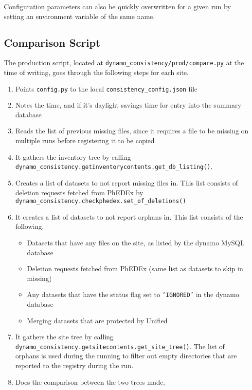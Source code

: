 Configuration parameters can also be quickly overwritten for a given run by
setting an environment variable of the same name.

\subsection{Comparison Script}

The production script,
located at \texttt{dynamo\_consistency/prod/compare.py} at the time of writing,
goes through the following steps for each site.
\begin{enumerate}
\item Points \texttt{config.py} to the local \texttt{consistency\_config.json} file
\item Notes the time, and if it’s daylight savings time for entry into the summary database
\item Reads the list of previous missing files,
  since it requires a file to be missing on multiple
  runs before registering it to be copied
\item It gathers the inventory tree by calling \\
  \texttt{dynamo\_consistency.getinventorycontents.get\_db\_listing()}.
\item Creates a list of datasets to not report missing files in.
  This list consists of deletion requests fetched from PhEDEx by \\
  \texttt{dynamo\_consistency.checkphedex.set\_of\_deletions()}
\item It creates a list of datasets to not report orphans in.
  This list consists of the following.
  \begin{itemize}
  \item Datasets that have any files on the site, as listed by the dynamo MySQL database
  \item Deletion requests fetched from PhEDEx (same list as datasets to skip in missing)
  \item Any datasets that have the status flag set to \texttt{'IGNORED'}
    in the dynamo database
  \item Merging datasets that are protected by Unified
  \end{itemize}
\item It gathers the site tree by calling \\
  \texttt{dynamo\_consistency.getsitecontents.get\_site\_tree()}.
  The list of orphans is used during the running to filter out empty directories that are
  reported to the registry during the run.
\item Does the comparison between the two trees made,

\end{enumerate}
